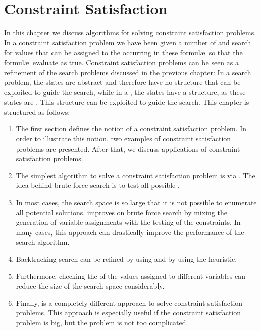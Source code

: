 \chapter{Constraint Satisfaction}
In this chapter we discuss algorithms for solving 
\href{https://en.wikipedia.org/wiki/Constraint_satisfaction_problem}{constraint satisfaction problems}.
In a constraint satisfaction problem we have been given a number of  and search for values that can be
assigned to the  occurring in these formul\ae\  so that the formul\ae\  evaluate as true.
Constraint satisfaction problems can be seen as a refinement of the search problems discussed in the previous
chapter:  In a search problem, the states are abstract and therefore have no structure that can be exploited to
guide the search, while in a , the states have a structure, as these
states are .  This structure can be exploited to guide the search.  This chapter is
structured as follows: 
\begin{enumerate}
\item The first section defines the notion of a constraint satisfaction problem.  In order to illustrate this
      notion, two examples of constraint satisfaction problems are presented.  After that, we discuss
      applications of constraint satisfaction problems.
\item The simplest algorithm to solve a constraint satisfaction problem is via .
      The idea behind brute force search is to test all possible .
\item In most cases, the search space is so large that it is not possible to enumerate all potential solutions.
       improves on brute force search by mixing the generation
      of variable assignments with the testing of the constraints.  In many cases, this approach can
      drastically improve the performance of the search algorithm.
\item Backtracking search can be refined by using  and by
      using the  heuristic.
\item Furthermore, checking the  of the values assigned to different variables
      can reduce the size of the search space considerably. 
\item Finally,  is a completely different approach to solve
      constraint satisfaction problems.  This approach is especially useful if the constraint satisfaction
      problem is big, but the problem is not too complicated.
\end{enumerate}


